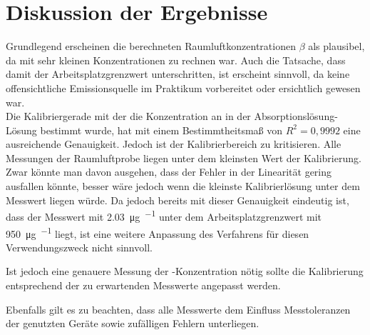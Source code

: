 \section{Diskussion der Ergebnisse}
\label{sec:diskussion}
Grundlegend erscheinen die berechneten Raumluftkonzentrationen $\beta$ als plausibel, da mit sehr kleinen Konzentrationen zu rechnen war. Auch die Tatsache, dass damit der Arbeitsplatzgrenzwert unterschritten, ist erscheint sinnvoll, da keine offensichtliche Emissionsquelle im Praktikum vorbereitet oder ersichtlich gewesen war.\\
Die Kalibriergerade mit der die Konzentration an  in der Absorptionslösung-Lösung bestimmt wurde, hat mit einem Bestimmtheitsmaß von $R^2=0,9992$ eine ausreichende Genauigkeit. Jedoch ist der Kalibrierbereich zu kritisieren. Alle Messungen der Raumluftprobe liegen unter dem kleinsten Wert der Kalibrierung. Zwar könnte man davon ausgehen, dass der Fehler in der Linearität gering ausfallen könnte, besser wäre jedoch wenn die kleinste Kalibrierlösung unter dem Messwert liegen würde. 
Da jedoch bereits mit dieser Genauigkeit eindeutig ist, dass der Messwert mit \SI{2,03}{\micro\gram \per \kmeter} unter dem Arbeitsplatzgrenzwert mit \SI{950}{\micro\gram \per \kmeter} liegt, ist eine weitere Anpassung des Verfahrens für diesen Verwendungszweck nicht sinnvoll.

Ist jedoch eine genauere Messung der -Konzentration nötig sollte die Kalibrierung entsprechend der zu erwartenden Messwerte angepasst werden.

Ebenfalls gilt es zu beachten, dass alle Messwerte dem Einfluss Messtoleranzen der genutzten Geräte sowie zufälligen Fehlern unterliegen.
